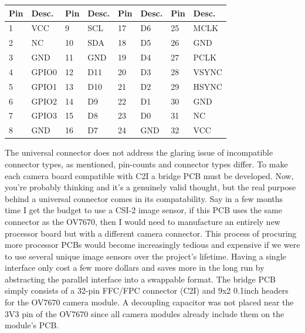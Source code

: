 \begin{indentedtable}
    \centering
    \begin{tabular}{|l|l||l|l||l|l||l|l|}
        \hline
        \textbf{Pin} & \textbf{Desc.} & \textbf{Pin} & \textbf{Desc.} & \textbf{Pin} & \textbf{Desc.} & \textbf{Pin} & \textbf{Desc.} \\
        \hline
        1 & VCC  & 9  & SCL & 17 & D6  & 25 & MCLK  \\
        \hline
        2 & NC   & 10 & SDA & 18 & D5  & 26 & GND   \\
        \hline
        3 & GND  & 11 & GND & 19 & D4  & 27 & PCLK  \\
        \hline
        4 & GPIO0 & 12 & D11 & 20 & D3  & 28 & VSYNC \\
        \hline
        5 & GPIO1 & 13 & D10 & 21 & D2  & 29 & HSYNC \\
        \hline
        6 & GPIO2 & 14 & D9  & 22 & D1  & 30 & GND   \\
        \hline
        7 & GPIO3 & 15 & D8  & 23 & D0  & 31 & NC    \\
        \hline
        8 & GND  & 16 & D7  & 24 & GND & 32 & VCC   \\
        \hline
    \end{tabular}
    \caption{C2I Pinout (32-pin mapping) for processor (invert for camera module).}
    \label{tab:camera-pinout-32}
\end{indentedtable}

The universal connector does not address the glaring issue of incompatible connector types, as mentioned, pin-counts and connector types differ. To make each camera board compatible with C2I a bridge PCB must be developed. Now, you're probably thinking  and it's a genuinely valid thought, but the real purpose behind a universal connector comes in its compatability. Say in a few months time I get the budget to use a CSI-2 image sensor, if this PCB uses the same connector as the OV7670, then I would need to manufacture an entirely new processor board but with a different camera connector. This process of procuring more processor PCBs would become increasingly tedious and expensive if we were to use several unique image sensors over the project's lifetime. Having a single interface only cost a few more dollars and saves more in the long run by abstracting the parallel interface into a swappable format.
\nl
The bridge PCB simply consists of a 32-pin FFC/FPC connector (C2I) and 9x2 0.1inch headers for the OV7670 camera module. A decoupling capacitor was not placed near the 3V3 pin of the OV7670 since all camera modules already include them on the module's PCB.